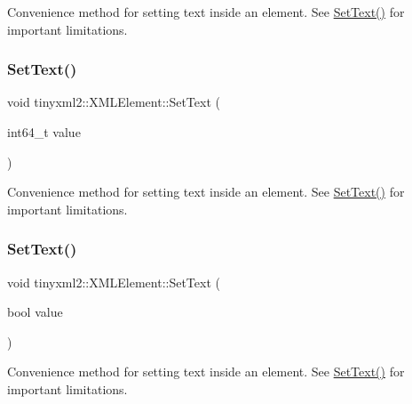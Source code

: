 Convenience method for setting text inside an element. See \hyperlink{classtinyxml2_1_1_x_m_l_element_a1f9c2cd61b72af5ae708d37b7ad283ce}{Set\+Text()} for important limitations. 

\mbox{\label{classtinyxml2_1_1_x_m_l_element_a7b62cd33acdfeff7ea2b1b330d4368e4}} 
\subsubsection{\texorpdfstring{Set\+Text()}{SetText()}\hspace{0.1cm}{\footnotesize\ttfamily [4/7]}}
{\footnotesize\ttfamily void tinyxml2\+::\+X\+M\+L\+Element\+::\+Set\+Text (\begin{DoxyParamCaption}\item[{int64\+\_\+t}]{value }\end{DoxyParamCaption})}



Convenience method for setting text inside an element. See \hyperlink{classtinyxml2_1_1_x_m_l_element_a1f9c2cd61b72af5ae708d37b7ad283ce}{Set\+Text()} for important limitations. 

\mbox{\label{classtinyxml2_1_1_x_m_l_element_ae4b543d6770de76fb6ab68e541c192a4}} 
\subsubsection{\texorpdfstring{Set\+Text()}{SetText()}\hspace{0.1cm}{\footnotesize\ttfamily [5/7]}}
{\footnotesize\ttfamily void tinyxml2\+::\+X\+M\+L\+Element\+::\+Set\+Text (\begin{DoxyParamCaption}\item[{bool}]{value }\end{DoxyParamCaption})}



Convenience method for setting text inside an element. See \hyperlink{classtinyxml2_1_1_x_m_l_element_a1f9c2cd61b72af5ae708d37b7ad283ce}{Set\+Text()} for important limitations. 

